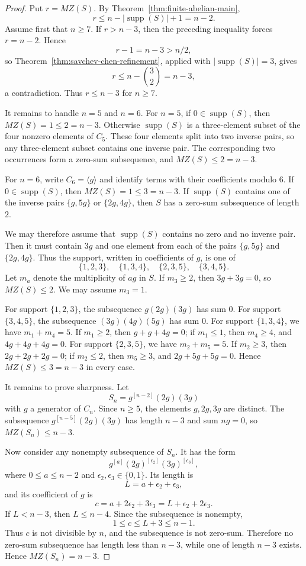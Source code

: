 \documentclass[12pt,reqno]{amsart}
\theoremstyle{definition}
\theoremstyle{remark}
\DeclareMathOperator{\supp}{supp}
\begin{document}
\begin{proof}
Put $r=MZ(S)$.  By Theorem~\ref{thm:finite-abelian-main},
\[
  r\le n-|\supp(S)|+1=n-2.
\]
Assume first that $n\ge 7$.  If $r>n-3$, then the preceding inequality forces $r=n-2$.  Hence
\[
  r-1=n-3>n/2,
\]
so Theorem~\ref{thm:savchev-chen-refinement}, applied with $|\supp(S)|=3$, gives
\[
  r\le n-\binom{3}{2}=n-3,
\]
a contradiction.  Thus $r\le n-3$ for $n\ge 7$.

It remains to handle $n=5$ and $n=6$.  For $n=5$, if $0\in\supp(S)$, then $MZ(S)=1\le 2=n-3$.  Otherwise $\supp(S)$ is a three-element subset of the four nonzero elements of $C_5$.  These four elements split into two inverse pairs, so any three-element subset contains one inverse pair.  The corresponding two occurrences form a zero-sum subsequence, and $MZ(S)\le 2=n-3$.

For $n=6$, write $C_6=\langle g\rangle$ and identify terms with their coefficients modulo $6$.  If $0\in\supp(S)$, then $MZ(S)=1\le 3=n-3$.  If $\supp(S)$ contains one of the inverse pairs $\{g,5g\}$ or $\{2g,4g\}$, then $S$ has a zero-sum subsequence of length $2$.

We may therefore assume that $\supp(S)$ contains no zero and no inverse pair.  Then it must contain $3g$ and one element from each of the pairs $\{g,5g\}$ and $\{2g,4g\}$.  Thus the support, written in coefficients of $g$, is one of
\[
  \{1,2,3\},\quad \{1,3,4\},\quad \{2,3,5\},\quad \{3,4,5\}.
\]
Let $m_a$ denote the multiplicity of $ag$ in $S$.  If $m_3\ge 2$, then $3g+3g=0$, so $MZ(S)\le 2$.  We may assume $m_3=1$.

For support $\{1,2,3\}$, the subsequence $g(2g)(3g)$ has sum $0$.  For support $\{3,4,5\}$, the subsequence $(3g)(4g)(5g)$ has sum $0$.  For support $\{1,3,4\}$, we have $m_1+m_4=5$.  If $m_1\ge 2$, then $g+g+4g=0$; if $m_1\le 1$, then $m_4\ge 4$, and $4g+4g+4g=0$.  For support $\{2,3,5\}$, we have $m_2+m_5=5$.  If $m_2\ge 3$, then $2g+2g+2g=0$; if $m_2\le 2$, then $m_5\ge 3$, and $2g+5g+5g=0$.  Hence $MZ(S)\le 3=n-3$ in every case.

It remains to prove sharpness.  Let
\[
  S_n=g^{[n-2]}(2g)(3g)
\]
with $g$ a generator of $C_n$.  Since $n\ge 5$, the elements $g,2g,3g$ are distinct.  The subsequence $g^{[n-5]}(2g)(3g)$ has length $n-3$ and sum $ng=0$, so $MZ(S_n)\le n-3$.

Now consider any nonempty subsequence of $S_n$.  It has the form
\[
  g^{[a]}(2g)^{[\epsilon_2]}(3g)^{[\epsilon_3]},
\]
where $0\le a\le n-2$ and $\epsilon_2,\epsilon_3\in\{0,1\}$.  Its length is
\[
  L=a+\epsilon_2+\epsilon_3,
\]
and its coefficient of $g$ is
\[
  c=a+2\epsilon_2+3\epsilon_3=L+\epsilon_2+2\epsilon_3.
\]
If $L<n-3$, then $L\le n-4$.  Since the subsequence is nonempty,
\[
  1\le c\le L+3\le n-1.
\]
Thus $c$ is not divisible by $n$, and the subsequence is not zero-sum.  Therefore no zero-sum subsequence has length less than $n-3$, while one of length $n-3$ exists.  Hence $MZ(S_n)=n-3$.
\end{proof}
\end{document}
